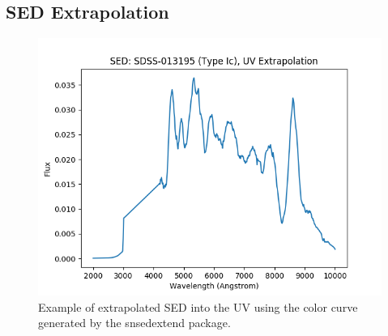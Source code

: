 \subsection{SED Extrapolation}
\begin{figure}[H]
\centering
\includegraphics[scale=.75,center]{FIG/seds/UV/typeIc}
\caption{\label{fig:FIG/typeIb/J_fits} Example of extrapolated SED into the UV using the color curve generated by the snsedextend package.}
\end{figure}
\bigskip
